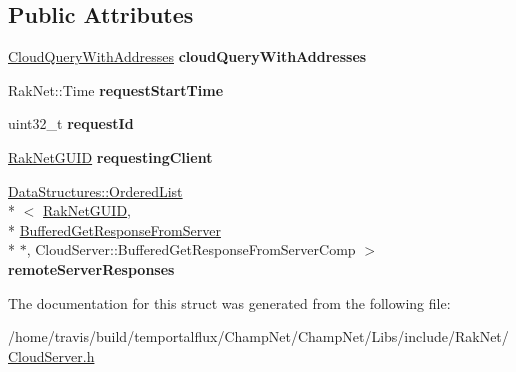 \subsection*{Public Attributes}
\begin{DoxyCompactItemize}
\item 
\hypertarget{struct_rak_net_1_1_cloud_server_1_1_get_request_a9ace875067d423d1ad39aaf98861e0b1}{\hyperlink{struct_rak_net_1_1_cloud_server_1_1_cloud_query_with_addresses}{Cloud\-Query\-With\-Addresses} {\bfseries cloud\-Query\-With\-Addresses}}\label{struct_rak_net_1_1_cloud_server_1_1_get_request_a9ace875067d423d1ad39aaf98861e0b1}

\item 
\hypertarget{struct_rak_net_1_1_cloud_server_1_1_get_request_ae237947ab51d91fa1a2d5a1677daff4d}{Rak\-Net\-::\-Time {\bfseries request\-Start\-Time}}\label{struct_rak_net_1_1_cloud_server_1_1_get_request_ae237947ab51d91fa1a2d5a1677daff4d}

\item 
\hypertarget{struct_rak_net_1_1_cloud_server_1_1_get_request_a79dee0bf69d40c28873e1e0c7055fe0c}{uint32\-\_\-t {\bfseries request\-Id}}\label{struct_rak_net_1_1_cloud_server_1_1_get_request_a79dee0bf69d40c28873e1e0c7055fe0c}

\item 
\hypertarget{struct_rak_net_1_1_cloud_server_1_1_get_request_a53f0e0ef8e8251dedd4d3d837138a96a}{\hyperlink{struct_rak_net_1_1_rak_net_g_u_i_d}{Rak\-Net\-G\-U\-I\-D} {\bfseries requesting\-Client}}\label{struct_rak_net_1_1_cloud_server_1_1_get_request_a53f0e0ef8e8251dedd4d3d837138a96a}

\item 
\hypertarget{struct_rak_net_1_1_cloud_server_1_1_get_request_ac77e7293107d46fa0e8b6bc32b472376}{\hyperlink{class_data_structures_1_1_ordered_list}{Data\-Structures\-::\-Ordered\-List}\\*
$<$ \hyperlink{struct_rak_net_1_1_rak_net_g_u_i_d}{Rak\-Net\-G\-U\-I\-D}, \\*
\hyperlink{struct_rak_net_1_1_cloud_server_1_1_buffered_get_response_from_server}{Buffered\-Get\-Response\-From\-Server} \\*
$\ast$, Cloud\-Server\-::\-Buffered\-Get\-Response\-From\-Server\-Comp $>$ {\bfseries remote\-Server\-Responses}}\label{struct_rak_net_1_1_cloud_server_1_1_get_request_ac77e7293107d46fa0e8b6bc32b472376}

\end{DoxyCompactItemize}


The documentation for this struct was generated from the following file\-:\begin{DoxyCompactItemize}
\item 
/home/travis/build/temportalflux/\-Champ\-Net/\-Champ\-Net/\-Libs/include/\-Rak\-Net/\hyperlink{_cloud_server_8h}{Cloud\-Server.\-h}\end{DoxyCompactItemize}
